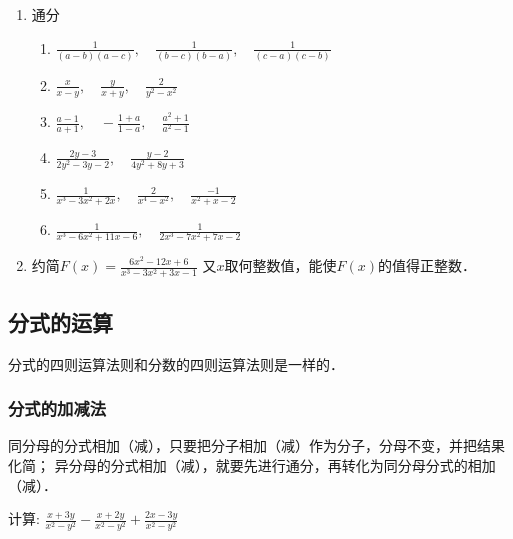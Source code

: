 \begin{ex}
\begin{enumerate}
\item  通分
\begin{enumerate}
\item  $\frac{1}{(a-b)(a-c)},\quad  \frac{1}{(b-c)(b-a)}, \quad \frac{1}{(c-a)(c-b)}$
\item $\frac{x}{x-y},\quad  \frac{y}{x+y}, \quad \frac{2}{y^{2}-x^{2}}$
\item  $\frac{a-1}{a+1},\quad -\frac{1+a}{1-a}, \quad \frac{a^{2}+1}{a^{2}-1}$
\item  $\frac{2 y-3}{2 y^{2}-3 y-2}, \quad \frac{y-2}{4 y^{2}+8 y+3}$
\item  $\frac{1}{x^{3}-3 x^{2}+2 x}, \quad \frac{2}{x^{4}-x^{2}}, \quad \frac{-1}{x^{2}+x-2}$
\item  $\frac{1}{x^{3}-6 x^{2}+11 x-6}, \quad \frac{1}{2 x^{3}-7 x^{2}+7 x-2}$
\end{enumerate}

\item 约简$F(x)=\frac{6x^2-12x+6}{x^3-3x^2+3x-1}$ 又$x$取何整数值，能使$F(x)$的值得正整数．
\end{enumerate}
\end{ex}

\subsection{分式的运算}
分式的四则运算法则和分数的四则运算法则是一样的．

\subsubsection{分式的加减法}

同分母的分式相加（减），只要把分子相加（减）作为分子，分母不变，并把结果化简；
异分母的分式相加（减），就要先进行通分，再转化为同分母分式的相加（减）．



\begin{example}
    计算: $\frac{x+3 y}{x^{2}-y^{2}}-\frac{x+2 y}{x^{2}-y^{2}}+\frac{2x-3y}{x^2-y^2}$
\end{example}


